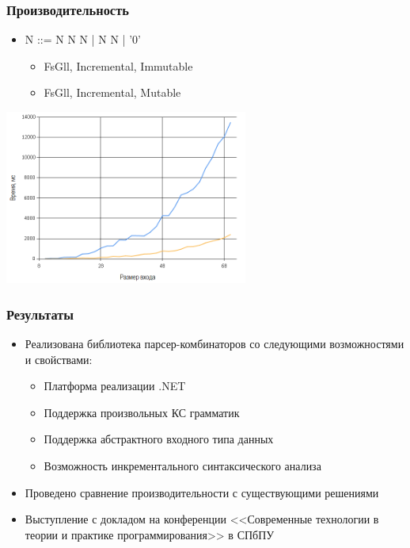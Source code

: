 \documentclass{beamer}
\begin{document}
\begin{frame}[fragile]
  \transwipe[direction=90]
  \frametitle{Производительность}
    \begin{itemize}
      \item N ::= N N N | N N | '0'
      \begin{itemize}
        \item \color{blue} FsGll, Incremental, Immutable
        \item \color{colorscala1} FsGll, Incremental, Mutable
      \end{itemize}
    \end{itemize}
    \includegraphics[width=8cm]{pictures/graph3.png}
\end{frame}

\begin{frame}[fragile]
  \transwipe[direction=90]
  \frametitle{Результаты}
  \begin{itemize}
    \item Реализована библиотека парсер-комбинаторов со следующими возможностями и свойствами:
    \begin{itemize}
      \item Платформа реализации .NET
      \item Поддержка произвольных КС грамматик
      \item Поддержка абстрактного входного типа данных
      \item Возможность инкрементального синтаксического анализа
    \end{itemize}
    \item Проведено сравнение производительности с существующими решениями
    \item Выступление с докладом на конференции <<Современные технологии в теории и практике программирования>> в СПбПУ
  \end{itemize}
\end{frame}
\end{document}
